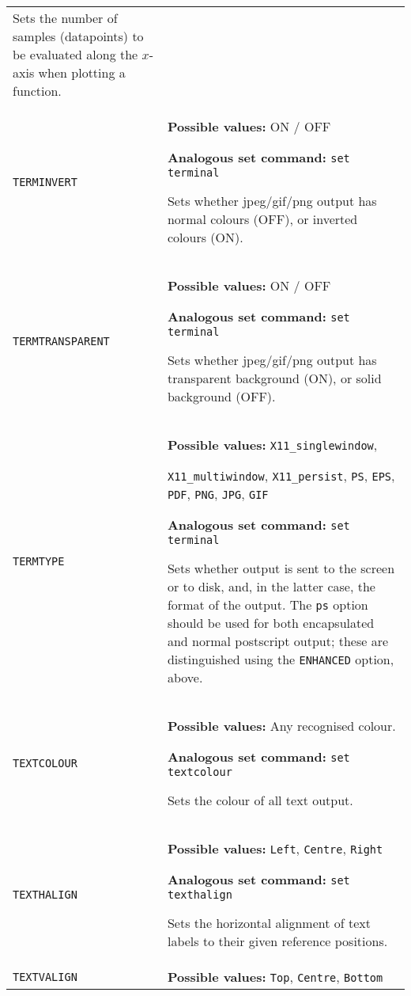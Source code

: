 \begin{longtable}{p{3.4cm}p{9cm}}
                   Sets the number of samples (datapoints) to be evaluated along the $x$-axis when plotting a function.
                   \\
{\tt TERMINVERT} & {\bf Possible values:} ON / OFF

                   {\bf Analogous set command:} {\tt set terminal}\index{set terminal command@{\tt set terminal} command}

                   Sets whether jpeg/gif/png output has normal colours (OFF), or inverted colours (ON).
                   \\
{\tt TERMTRANSPARENT} & {\bf Possible values:} ON / OFF

                   {\bf Analogous set command:} {\tt set terminal}\index{set terminal command@{\tt set terminal} command}

                   Sets whether jpeg/gif/png output has transparent background (ON), or solid background (OFF).
                   \\
{\tt TERMTYPE} & {\bf Possible values:} {\tt X11\_singlewindow},

                   {\tt X11\_multiwindow}, {\tt X11\_persist}, {\tt PS}, {\tt EPS}, {\tt PDF}, {\tt PNG}, {\tt JPG}, {\tt GIF}

                   {\bf Analogous set command:} {\tt set terminal}\index{set terminal command@{\tt set terminal} command}

                   Sets whether output is sent to the screen or to disk, and, in the latter case, the format of the output. The {\tt ps} option should be used for both encapsulated and normal postscript output; these are distinguished using the {\tt ENHANCED} option, above.
                   \\
{\tt TEXTCOLOUR} & {\bf Possible values:} Any recognised colour.

                   {\bf Analogous set command:} {\tt set textcolour}\index{set textcolour command@{\tt set textcolour} command}

                   Sets the colour of all text output.
                   \\
{\tt TEXTHALIGN} & {\bf Possible values:} {\tt Left}, {\tt Centre}, {\tt Right}

                   {\bf Analogous set command:} {\tt set texthalign}\index{set texthalign command@{\tt set texthalign} command}

                   Sets the horizontal alignment of text labels to their given reference positions.
                   \\
{\tt TEXTVALIGN} & {\bf Possible values:} {\tt Top}, {\tt Centre}, {\tt Bottom}


\end{longtable}

